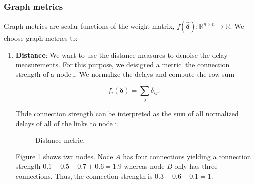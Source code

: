 \documentclass[12pt,a4paper,english]{article}
\begin{document}
\subsubsection{Graph metrics}
Graph metrics are scalar functions of the weight matrix, $f(\bm{\hat{\delta}}): \mathbb{R}^{n \times n}\rightarrow \mathbb{R}$. We choose graph metrics to:
\begin{enumerate}
\item \textbf{Distance}: We want to use the distance measures to denoise the delay measurements. For this purpose, we deisigned a metric, the connection strength of a node i. We normalize the delays and compute the row sum 

\begin{equation}
f_i (\bm{\delta})= \sum_j{\delta_{ij}}.  
\end{equation}

Thde connection strength can be interpreted as the sum of all normalized delays of all of the links to node i.

\begin{figure}[htb]
\centering
{}
\caption{Distance metric.} \label{fig:1}
\end{figure}
Figure \ref{fig:1} shows two nodes. Node $A$ has four connections yielding a connection strength $0.1+0.5+0.7+0.6=1.9$ whereas node $B$ only has three connections. Thus, the connection strength is $0.3+0.6+0.1=1$.




\end{enumerate}
\end{document}
